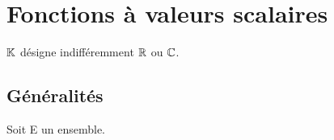 
\section{Fonctions à valeurs scalaires}

\vspace{0.5cm}

\begin{center}
    \( \mathbb{K}\) désigne indifféremment \(\mathbb{R}\) ou \(\mathbb{C}\).
\end{center}


\subsection{Généralités}

\vspace{0.2cm}

\begin{center}
Soit E un ensemble. 
\end{center}

\vspace{0.6cm}

